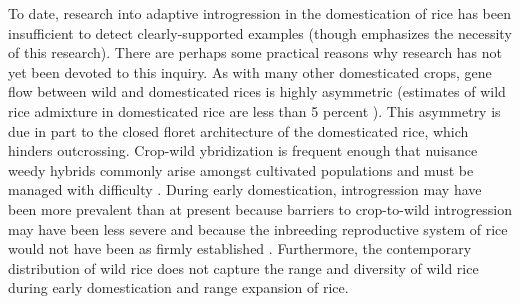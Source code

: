 \documentclass[11pt]{article}
\begin{document}
\begin{enumerate}
To date, research into adaptive introgression in the domestication of rice has been insufficient to detect clearly-supported examples (though \cite{zhao2010genomic} emphasizes the necessity of this research).
There are perhaps some practical reasons why research has not yet been devoted to this inquiry.
As with many other domesticated crops, gene flow between wild and domesticated rices is highly asymmetric (estimates of wild rice admixture in domesticated rice are less than 5 percent \cite{wang2017asian}).
This asymmetry is due in part to the closed floret architecture of the domesticated rice, which hinders outcrossing.
Crop-wild ybridization is frequent enough that nuisance weedy hybrids commonly arise amongst cultivated populations and must be managed with difficulty \cite{vaughan2008evolving}.
During early domestication, introgression may have been more prevalent than at present because barriers to crop-to-wild introgression may have been less severe and because the inbreeding reproductive system of rice would not have been as firmly established \cite{vaughan2008evolving}.
Furthermore, the contemporary distribution of wild rice does not capture the range and diversity of wild rice during early domestication and range expansion of rice.










\end{enumerate}

	

	
	
	
	
	
	
	
	
\end{document}
